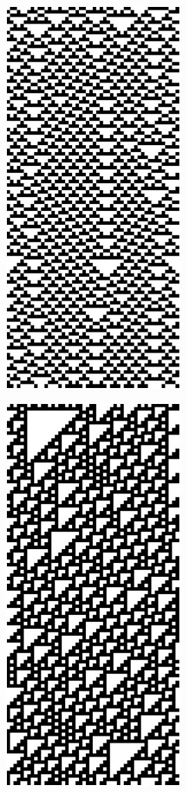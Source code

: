 \begin{figure}
\begin{subfigure}[b]{0.275\textwidth}
		\caption[]{}%
	\end{subfigure}%
	\hfill
	\begin{subfigure}[b]{0.275\textwidth}
		\centering
		\includegraphics[scale=0.32]{./images/CA_FDM/rule54}
		\caption[]{}%
	\end{subfigure}%
	\begin{subfigure}[b]{0.275\textwidth}
		\centering
		\includegraphics[scale=0.32]{./images/CA_FDM/rule110}
		\caption[]{}%
	\end{subfigure}%
	
\end{figure}
